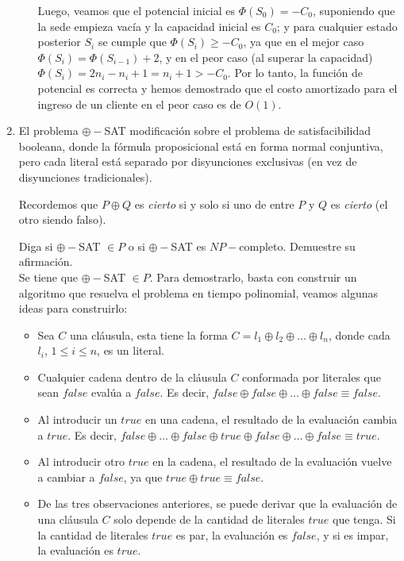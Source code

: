 \documentclass[letterpaper, 12pt]{article}
\begin{document}
\begin{enumerate}
\begin{itemize}
    Luego, veamos que el potencial inicial es $\Phi(S_0) = -C_0$, suponiendo que la sede empieza vacía y la capacidad inicial es $C_0$; y para cualquier estado posterior $S_i$ se cumple que $\Phi(S_i) \geq -C_0$, ya que en el mejor caso $\Phi(S_i) = \Phi(S_{i-1}) + 2$, y en el peor caso (al superar la capacidad) $\Phi(S_i) = 2n_i - n_i + 1 = n_i + 1 > -C_0$. Por lo tanto, la función de potencial es correcta y hemos demostrado que el costo amortizado para el ingreso de un cliente en el peor caso es de $O(1)$.
\end{itemize}


\item El problema $\oplus-$SAT modificación sobre el problema de satisfacibilidad booleana, donde la fórmula proposicional está en forma normal conjuntiva, pero cada literal está separado por disyunciones exclusivas (en vez de disyunciones tradicionales).

Recordemos que $P \oplus Q$ es \emph{cierto} si y solo si uno de entre $P$ y $Q$ es \emph{cierto} (el otro siendo falso).

Diga si $\oplus-$SAT $\in P$ o si $\oplus-$SAT es $NP-$completo. Demuestre su afirmación. \\

Se tiene que $\oplus-$SAT $\in P$. Para demostrarlo, basta con construir un algoritmo que resuelva el problema en tiempo polinomial, veamos algunas ideas para construirlo:
\begin{itemize}
    \item Sea $C$ una cláusula, esta tiene la forma $C = l_1 \oplus l_2 \oplus \dots \oplus l_n$, donde cada $l_i$, $1 \leq i \leq n$, es un literal.
    \item Cualquier cadena dentro de la cláusula $C$ conformada por literales que sean $false$ evalúa a $false$. Es decir, $false \oplus false \oplus \dots \oplus false \equiv false$.
    \item Al introducir un $true$ en una cadena, el resultado de la evaluación cambia a $true$. Es decir, $false \oplus \dots \oplus false \oplus true \oplus false \oplus \dots \oplus false \equiv true$.
    \item Al introducir otro $true$ en la cadena, el resultado de la evaluación vuelve a cambiar a $false$, ya que $true \oplus true \equiv false$.
    \item De las tres observaciones anteriores, se puede derivar que la evaluación de una cláusula $C$ solo depende de la cantidad de literales $true$ que tenga. Si la cantidad de literales $true$ es par, la evaluación es $false$, y si es impar, la evaluación es $true$.
\end{itemize}


\end{enumerate}
\end{document}
